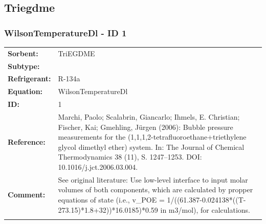 \subsection{Triegdme }
%
\subsubsection{WilsonTemperatureDl - ID 1}
%
\begin{tabular}[l]{|lp{11.5cm}|}
\hline
\addlinespace

\textbf{Sorbent:} & TriEGDME \\
\textbf{Subtype:} &  \\
\textbf{Refrigerant:} & R-134a \\
\textbf{Equation:} & WilsonTemperatureDl \\
\textbf{ID:} & 1 \\
\textbf{Reference:} & Marchi, Paolo; Scalabrin, Giancarlo; Ihmels, E. Christian; Fischer, Kai; Gmehling, Jürgen (2006): Bubble pressure measurements for the (1,1,1,2-tetrafluoroethane+triethylene glycol dimethyl ether) system. In: The Journal of Chemical Thermodynamics 38 (11), S. 1247–1253. DOI: 10.1016/j.jct.2006.03.004. \\
\textbf{Comment:} & See original literature: Use low-level interface to input molar volumes of both components, which are calculated by propper equations of state (i.e., v\_POE =   1/((61.387-0.024138*((T-273.15)*1.8+32))*16.0185)*0.59 in m3/mol), for calculations. \\

\addlinespace
\hline
\end{tabular}
\newline

